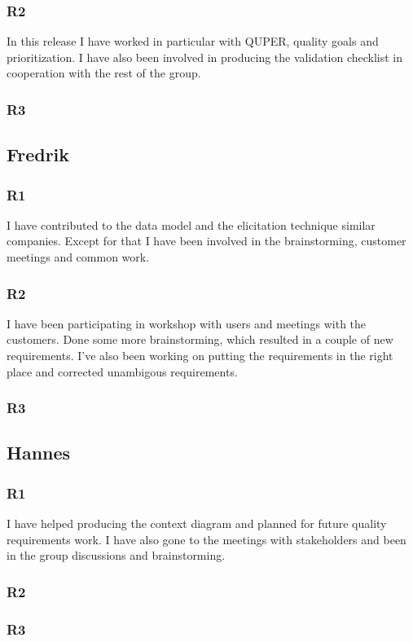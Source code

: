 \documentclass[a4paper]{article}
\begin{document}
    \subsubsection{R2}
	In this release I have worked in particular with QUPER, quality goals and prioritization. I have also been involved in producing the validation checklist in cooperation with the rest of the group.
    \subsubsection{R3}
	
  \subsection{Fredrik}
    \subsubsection{R1}
    I have contributed to the data model and the elicitation technique similar companies. Except for that I have been involved in the brainstorming, customer meetings and common work.
    \subsubsection{R2}
    I have been participating in workshop with users and meetings with the customers. Done some more brainstorming, which resulted in a couple of new requirements. I've also been working on putting the requirements in the right place and corrected unambigous requirements.
    \subsubsection{R3}
  	
  \subsection{Hannes}
    \subsubsection{R1}
    I have helped producing the context diagram and planned for future quality requirements work. I have also gone to the meetings with stakeholders and been in the group discussions and brainstorming.
    \subsubsection{R2}
    \subsubsection{R3}
  
\end{document}
